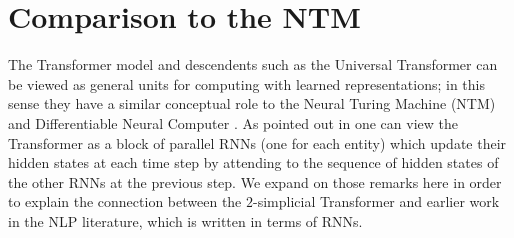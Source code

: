 \documentclass{article} %
\begin{document}



\section{Comparison to the NTM}
\label{appendix:ntmcomparison}

The Transformer model and descendents such as the Universal Transformer \citep{ut} can be viewed as general units for computing with learned representations; in this sense they have a similar conceptual role to the Neural Turing Machine (NTM) \citep{ntm} and Differentiable Neural Computer \citep{graves_etal}. As pointed out in \cite[\S 4]{ut} one can view the Transformer as a block of parallel RNNs (one for each entity) which update their hidden states at each time step by attending to the sequence of hidden states of the other RNNs at the previous step. We expand on those remarks here in order to explain the connection between the $2$-simplicial Transformer and earlier work in the NLP literature, which is written in terms of RNNs.
\end{document}

